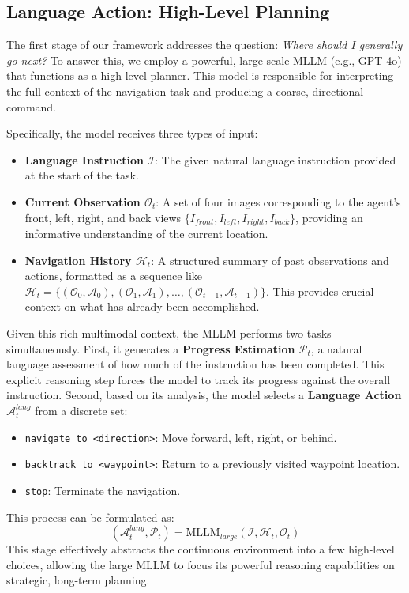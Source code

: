 \documentclass[letterpaper, 10 pt, conference]{ieeeconf}
\begin{document}
\subsection{Language Action: High-Level Planning}
The first stage of our framework addresses the question: \textit{Where should I generally go next?} To answer this, we employ a powerful, large-scale MLLM (e.g., GPT-4o) that functions as a high-level planner. This model is responsible for interpreting the full context of the navigation task and producing a coarse, directional command.

Specifically, the model receives three types of input:
\begin{itemize}
    \item \textbf{Language Instruction $\mathcal{I}$}: The given natural language instruction provided at the start of the task.
    \item \textbf{Current Observation $\mathcal{O}_t$}: A set of four images corresponding to the agent's front, left, right, and back views $\{I_{front}, I_{left}, I_{right}, I_{back}\}$, providing an informative understanding of the current location.
    \item \textbf{Navigation History $\mathcal{H}_t$}: A structured summary of past observations and actions, formatted as a sequence like $\mathcal{H}_t = \{(\mathcal{O}_0, \mathcal{A}_0), (\mathcal{O}_1, \mathcal{A}_1), \ldots, (\mathcal{O}_{t-1}, \mathcal{A}_{t-1})\}$. This provides crucial context on what has already been accomplished.

\end{itemize}

Given this rich multimodal context, the MLLM performs two tasks simultaneously. First, it generates a \textbf{Progress Estimation $\mathcal{P}_t$}, a natural language assessment of how much of the instruction has been completed. This explicit reasoning step forces the model to track its progress against the overall instruction.
Second, based on its analysis, the model selects a \textbf{Language Action $\mathcal{A}^{lang}_t$} from a discrete set:
\begin{itemize}
    \item \texttt{navigate to <direction>}: Move forward, left, right, or behind.
    \item \texttt{backtrack to <waypoint>}: Return to a previously visited waypoint location.
    \item \texttt{stop}: Terminate the navigation.
\end{itemize}
This process can be formulated as:
\begin{equation}
(\mathcal{A}^{lang}_t, \mathcal{P}_t) = \text{MLLM}_{large}(\mathcal{I}, \mathcal{H}_t, \mathcal{O}_t)
\end{equation}
This stage effectively abstracts the continuous environment into a few high-level choices, allowing the large MLLM to focus its powerful reasoning capabilities on strategic, long-term planning.
\end{document}
